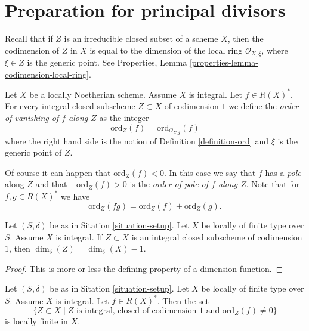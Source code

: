 \section{Preparation for principal divisors}
\label{section-preparation-principal-divisors}

\noindent
Recall that if $Z$ is an irreducible closed subset of a scheme $X$,
then the codimension of $Z$ in $X$ is equal to the dimension
of the local ring $\mathcal{O}_{X, \xi}$, where $\xi \in Z$
is the generic point. See
Properties, Lemma \ref{properties-lemma-codimension-local-ring}.

\begin{definition}
\label{definition-order-vanishing}
Let $X$ be a locally Noetherian scheme. Assume $X$ is integral.
Let $f \in R(X)^*$. For every integral closed subscheme
$Z \subset X$ of codimension $1$ we define
the {\it order of vanishing of $f$ along $Z$} as the integer
$$
\text{ord}_Z(f) = \text{ord}_{\mathcal{O}_{X, \xi}}(f)
$$
where the right hand side is the notion of
Definition \ref{definition-ord} and $\xi$ is the generic point of $Z$.
\end{definition}

\noindent
Of course it can happen that $\text{ord}_Z(f) < 0$.
In this case we say that $f$ has a {\it pole} along $Z$
and that $-\text{ord}_Z(f) > 0$ is the {\it order of pole of
$f$ along $Z$}. Note that for $f, g \in R(X)^*$ we have
$$
\text{ord}_Z(fg) = \text{ord}_Z(f) + \text{ord}_Z(g).
$$

\begin{lemma}
\label{lemma-divisor-delta-dimension}
Let $(S, \delta)$ be as in Sitation \ref{situation-setup}.
Let $X$ be locally of finite type over $S$. Assume $X$ is
integral. If $Z \subset X$ is an integral closed subscheme
of codimension $1$, then $\dim_\delta(Z) = \dim_\delta(X) - 1$.
\end{lemma}

\begin{proof}
This is more or less the defining property of a dimension function.
\end{proof}

\begin{lemma}
\label{lemma-divisor-locally-finite}
Let $(S, \delta)$ be as in Sitation \ref{situation-setup}.
Let $X$ be locally of finite type over $S$. Assume $X$ is
integral. Let $f \in R(X)^*$. Then the set
$$
\{Z \subset X \mid Z \text{ is integral, closed of codimension }1
\text{ and }\text{ord}_Z(f) \not = 0\}
$$
is locally finite in $X$.
\end{lemma}

